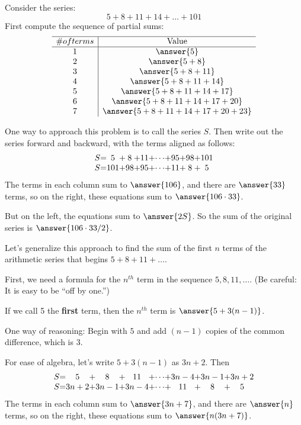 \documentclass[nooutcomes]{ximera}
\begin{document}
\begin{problem}
Consider the series: 
\[
5+8+11+14+\dots+101
\]
First compute the sequence of partial sums: 
\[
\begin{array}{c|c} \hline
\# of terms & \text{Value} \\ \hline
1 & \answer{5} \\
2 & \answer{5+8} \\
3 & \answer{5+8+11}\\
4 & \answer{5+8+11+14}\\
5 & \answer{5+8+11+14+17}\\
6 & \answer{5+8+11+14+17+20}\\
7 & \answer{5+8+11+14+17+20+23}\\
\end{array}
\]

\begin{problem}
One way to approach this problem is to call the series $S$.  Then write out the series forward and backward, with the terms aligned as follows:  
\[
\begin{array}{c@{ = }c@{ + }c@{ + }c@{ + }c@{ + }c@{ + }c@{ + }c}
S & 5 & 8 & 11 & \cdots & 95 & 98 & 101 \\
S & 101 & 98 & 95 & \cdots & 11 & 8 & 5 
\end{array}
\]
The terms in each column sum to $\answer{106}$, and there are $\answer{33}$ terms, so on the right, these equations sum to $\answer{106\cdot 33}$.  

But on the left, the equations sum to $\answer{2S}$.  So the sum of the original series is 
$\answer{106\cdot 33/2}$. 

\begin{problem}
Let's generalize this approach to find the sum of the first $n$ terms of the arithmetic series that begins $5+8+11+\dots$.  

First, we need a formula for the $n^{th}$ term in the sequence $5, 8, 11, \dots$.  (Be careful:  It is easy to be ``off by one.'')

If we call 5 the \textbf{first} term, then the $n^{th}$ term is $\answer{5+3(n-1)}$.  
\begin{feedback}
One way of reasoning:  Begin with $5$ and add $(n-1)$ copies of the common difference, which is $3$.  
\end{feedback}

\begin{problem}
For ease of algebra, let's write $5+3(n-1)$ as $3n+2$.  Then 
\[
\begin{array}{c@{ = }c@{ + }c@{ + }c@{ + }c@{ + }c@{ + }c@{ + }c}
S & 5 & 8 & 11 & \cdots & 3n-4 & 3n-1 & 3n+2 \\
S & 3n+2 & 3n-1 & 3n-4 & \cdots & 11 & 8 & 5 
\end{array}
\]
The terms in each column sum to $\answer{3n+7}$, and there are $\answer{n}$ terms, so on the right, these equations sum to $\answer{n(3n+7)}$.  


\end{problem}
\end{problem}
\end{problem}
\end{problem}
\end{document}
